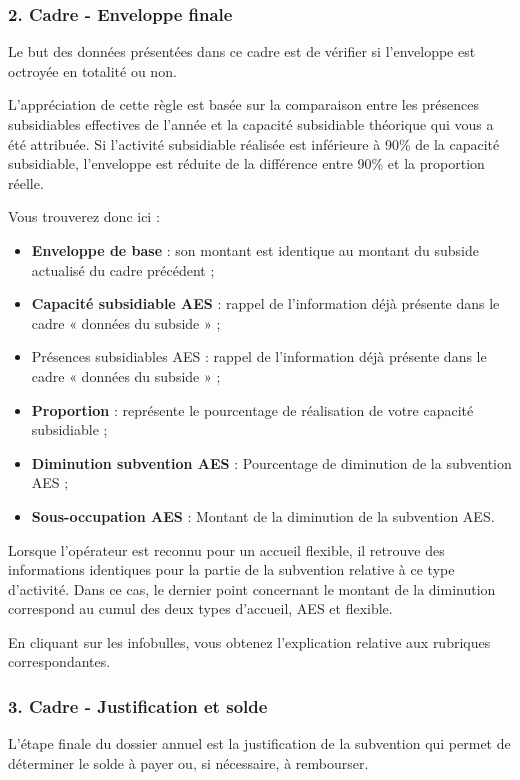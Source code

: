 \subsubsection{2. Cadre - Enveloppe finale}
Le but des données présentées dans ce cadre est de vérifier si l’enveloppe est octroyée en totalité ou non. 

\begin{remarque}
L’appréciation de cette règle est basée sur la comparaison entre les présences subsidiables effectives de l’année et la capacité subsidiable théorique qui vous a été attribuée. Si l’activité subsidiable réalisée est inférieure à 90\% de la capacité subsidiable, l’enveloppe est réduite de la différence entre 90\% et la proportion réelle.  
\end{remarque}
Vous trouverez donc ici :

\begin{itemize}
    \item \textbf{Enveloppe de base} : son montant est identique au montant du subside actualisé du cadre précédent ;
    \item \textbf{Capacité subsidiable AES} : rappel de l’information déjà présente dans le cadre « données du subside » ;
    \item Présences subsidiables AES : rappel de l’information déjà présente dans le cadre « données du subside » ;
    \item \textbf{Proportion} : représente le pourcentage de réalisation de votre capacité subsidiable ;
    \item \textbf{Diminution subvention AES} : Pourcentage de diminution de la subvention AES ;
    \item \textbf{Sous-occupation AES} : Montant de la diminution de la subvention AES.
    
\end{itemize}
Lorsque l’opérateur est reconnu pour un accueil flexible, il retrouve des informations identiques pour la partie de la subvention relative à ce type d’activité. Dans ce cas, le dernier point concernant le montant de la diminution correspond au cumul des deux types d’accueil, AES et flexible. 

En cliquant sur les infobulles, vous obtenez l’explication relative aux rubriques correspondantes.

\subsubsection{3. Cadre - Justification et solde}
L’étape finale du dossier annuel est la justification de la subvention qui permet de déterminer le solde à payer ou, si nécessaire, à rembourser. 

